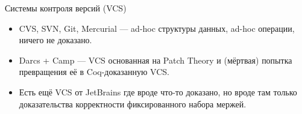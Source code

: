 \begin{frame}{Системы контроля версий (VCS)}
  \begin{itemize}
  \item CVS, SVN, Git, Mercurial — ad-hoc структуры данных, ad-hoc операции, ничего не доказано.
  \item Darcs + Camp — VCS основанная на Patch Theory и (мёртвая) попытка превращения её в Coq-доказанную VCS.
  \item Есть ещё VCS от JetBrains где вроде что-то доказано, но вроде там только доказательства корректности фиксированного набора мержей.
  \end{itemize}
\end{frame}
